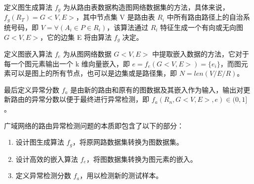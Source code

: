 
定义图生成算法 $f_g$ 为从路由表数据构造图网络数据集的方法，具体来说，$f_g(R_T)=G<V,E>$，其中节点集 V 是路由表 ${R_i}$ 中所有路由路径上的自治系统号码，即 $V = \forall(A_i \in P \in R_i)$，该算法通过 $R_i$ 特征生成一个有向或无向图 $G<V,E>$，它的边集 E 将由算法 $f_g$ 决定。

定义图嵌入算法 $f_e$ 为从图网络数据 $G<V,E>$ 中提取嵌入数据的方法，它对于每一个图元素输出一个 k 维向量嵌入，即 $e = f_e(G<V,E>) = \{ e_i \}$，而图元素可以是图上的所有节点，也可以是边集或是路径集，即 $N = len(V/E/R)$。

最后定义异常分数 $f_a$ 是由新的路由和原有的图数据及其嵌入作为输入，输出对更新路由的异常分数以便于最终进行异常检测，即 $f_a(R_n,G<V,E>,e) \in (0,1]$。

广域网络的路由异常检测问题的本质即包含了以下的部分：

\begin{enumerate}
    \item 设计图生成算法 $f_g$，将原网路数据集转换为图数据集。
    \item 设计高效的嵌入算法 $f_e$，将图数据集转换为图元素的嵌入。
    \item 定义异常检测分数 $f_a$，用以检测新的测试样本。
\end{enumerate}
